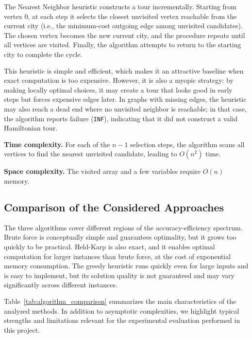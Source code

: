 The Nearest Neighbor heuristic constructs a tour incrementally. Starting from vertex 0, at each step it selects the closest unvisited vertex reachable from the current city (i.e., the minimum-cost outgoing edge among unvisited candidates). The chosen vertex becomes the new current city, and the procedure repeats until all vertices are visited. Finally, the algorithm attempts to return to the starting city to complete the cycle.

This heuristic is simple and efficient, which makes it an attractive baseline when exact computation is too expensive. However, it is also a myopic strategy: by making locally optimal choices, it may create a tour that looks good in early steps but forces expensive edges later. In graphs with missing edges, the heuristic may also reach a dead end where no unvisited neighbor is reachable; in that case, the algorithm reports failure (\texttt{INF}), indicating that it did not construct a valid Hamiltonian tour.

\textbf{Time complexity.} For each of the $n - 1$ selection steps, the algorithm scans all vertices to find the nearest unvisited candidate, leading to $O(n^2)$ time.

\textbf{Space complexity.} The visited array and a few variables require $O(n)$ memory.

\subsection{Comparison of the Considered Approaches}

The three algorithms cover different regions of the accuracy-efficiency spectrum. Brute force is conceptually simple and guarantees optimality, but it grows too quickly to be practical. Held-Karp is also exact, and it enables optimal computation for larger instances than brute force, at the cost of exponential memory consumption. The greedy heuristic runs quickly even for large inputs and is easy to implement, but its solution quality is not guaranteed and may vary significantly across different instances.

Table~\ref{tab:algorithm_comparison} summarizes the main characteristics of the analyzed methods. In addition to asymptotic complexities, we highlight typical strengths and limitations relevant for the experimental evaluation performed in this project.

